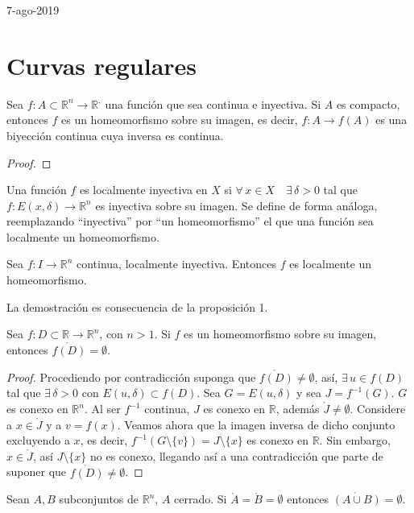 7-ago-2019
\section{Curvas regulares}
\begin{proposition}
  Sea $f:A \subset \mathbb{R}^n \to \mathbb{R}^,$ una función que sea continua e
  inyectiva. Si $A$ es compacto, entonces $f$ es un homeomorfismo sobre su
  imagen, es decir, $f: A \to f(A)$ es una biyección continua cuya inversa es
  continua.
\end{proposition}
\begin{proof}
\end{proof}
\begin{definition}
  Una función $f$ es localmente inyectiva en $X$ si $\forall \, x \in X \quad
  \exists \, \delta > 0 $ tal que $f:E(x,\delta) \to \mathbb{R}^n$ es inyectiva
  sobre su imagen. Se define de forma análoga, reemplazando ``inyectiva'' por ``un
  homeomorfismo'' el que una función sea localmente un homeomorfismo.
\end{definition}
\begin{proposition}
  Sea $f: I \to \mathbb{R}^n$ continua, localmente inyectiva. Entonces $f$ es
  localmente un homeomorfismo. 
\end{proposition}
La demostración es consecuencia de la proposición 1.
\begin{proposition}
  Sea $f:D \subset \mathbb{R} \to \mathbb{R}^n$, con $n>1$. Si $f$ es un
  homeomorfismo sobre su imagen, entonces $\mathring{f(D)} = \emptyset$.
\end{proposition}
\begin{proof}
  Procediendo por contradicción suponga que $\mathring{f(D)} \neq \emptyset$,
  así, $\exists \, u \in f(D)$ tal que $\exists \, \delta > 0$ con
  $E(u,\delta)\subset f(D)$. Sea $G = E(u,\delta)$ y sea $J = f^{-1}(G)$. $G$ es
  conexo en $\mathbb{R}^n$. Al ser $f^{-1}$ continua, $J$ es conexo en
  $\mathbb{R}$, además $\mathring{J} \neq \emptyset$. Considere a $x\in
  \mathring{J}$ y a $v = f(x)$. Veamos ahora que la imagen inversa de dicho
  conjunto excluyendo a $x$, es decir, $f^{-1}(G\setminus\{v\}) = J \setminus
  \{x\}$ es conexo en $\mathbb{R}$. Sin embargo, $x \in \mathring{J}$, así $J
  \setminus \{x\}$ no es conexo, llegando así a una contradicción que parte de
  suponer que $\mathring{f(D)}\neq \emptyset$.
\end{proof}
\begin{lemma}
  Sean $A,B$ subconjuntos de $\mathbb{R}^n$, $A$ cerrado. Si $\mathring{A} =
  \mathring{B} = \emptyset$ entonces $\mathring{(A\cup B)} = \emptyset$.
\end{lemma}
